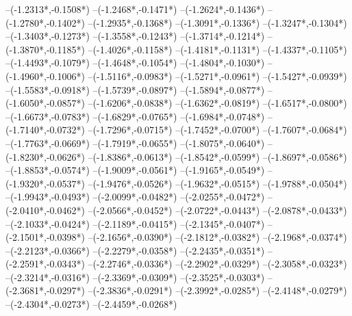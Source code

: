 {	--({-1.2313*\dx},{-0.1508*\dy})
	--({-1.2468*\dx},{-0.1471*\dy})
	--({-1.2624*\dx},{-0.1436*\dy})
	--({-1.2780*\dx},{-0.1402*\dy})
	--({-1.2935*\dx},{-0.1368*\dy})
	--({-1.3091*\dx},{-0.1336*\dy})
	--({-1.3247*\dx},{-0.1304*\dy})
	--({-1.3403*\dx},{-0.1273*\dy})
	--({-1.3558*\dx},{-0.1243*\dy})
	--({-1.3714*\dx},{-0.1214*\dy})
	--({-1.3870*\dx},{-0.1185*\dy})
	--({-1.4026*\dx},{-0.1158*\dy})
	--({-1.4181*\dx},{-0.1131*\dy})
	--({-1.4337*\dx},{-0.1105*\dy})
	--({-1.4493*\dx},{-0.1079*\dy})
	--({-1.4648*\dx},{-0.1054*\dy})
	--({-1.4804*\dx},{-0.1030*\dy})
	--({-1.4960*\dx},{-0.1006*\dy})
	--({-1.5116*\dx},{-0.0983*\dy})
	--({-1.5271*\dx},{-0.0961*\dy})
	--({-1.5427*\dx},{-0.0939*\dy})
	--({-1.5583*\dx},{-0.0918*\dy})
	--({-1.5739*\dx},{-0.0897*\dy})
	--({-1.5894*\dx},{-0.0877*\dy})
	--({-1.6050*\dx},{-0.0857*\dy})
	--({-1.6206*\dx},{-0.0838*\dy})
	--({-1.6362*\dx},{-0.0819*\dy})
	--({-1.6517*\dx},{-0.0800*\dy})
	--({-1.6673*\dx},{-0.0783*\dy})
	--({-1.6829*\dx},{-0.0765*\dy})
	--({-1.6984*\dx},{-0.0748*\dy})
	--({-1.7140*\dx},{-0.0732*\dy})
	--({-1.7296*\dx},{-0.0715*\dy})
	--({-1.7452*\dx},{-0.0700*\dy})
	--({-1.7607*\dx},{-0.0684*\dy})
	--({-1.7763*\dx},{-0.0669*\dy})
	--({-1.7919*\dx},{-0.0655*\dy})
	--({-1.8075*\dx},{-0.0640*\dy})
	--({-1.8230*\dx},{-0.0626*\dy})
	--({-1.8386*\dx},{-0.0613*\dy})
	--({-1.8542*\dx},{-0.0599*\dy})
	--({-1.8697*\dx},{-0.0586*\dy})
	--({-1.8853*\dx},{-0.0574*\dy})
	--({-1.9009*\dx},{-0.0561*\dy})
	--({-1.9165*\dx},{-0.0549*\dy})
	--({-1.9320*\dx},{-0.0537*\dy})
	--({-1.9476*\dx},{-0.0526*\dy})
	--({-1.9632*\dx},{-0.0515*\dy})
	--({-1.9788*\dx},{-0.0504*\dy})
	--({-1.9943*\dx},{-0.0493*\dy})
	--({-2.0099*\dx},{-0.0482*\dy})
	--({-2.0255*\dx},{-0.0472*\dy})
	--({-2.0410*\dx},{-0.0462*\dy})
	--({-2.0566*\dx},{-0.0452*\dy})
	--({-2.0722*\dx},{-0.0443*\dy})
	--({-2.0878*\dx},{-0.0433*\dy})
	--({-2.1033*\dx},{-0.0424*\dy})
	--({-2.1189*\dx},{-0.0415*\dy})
	--({-2.1345*\dx},{-0.0407*\dy})
	--({-2.1501*\dx},{-0.0398*\dy})
	--({-2.1656*\dx},{-0.0390*\dy})
	--({-2.1812*\dx},{-0.0382*\dy})
	--({-2.1968*\dx},{-0.0374*\dy})
	--({-2.2123*\dx},{-0.0366*\dy})
	--({-2.2279*\dx},{-0.0358*\dy})
	--({-2.2435*\dx},{-0.0351*\dy})
	--({-2.2591*\dx},{-0.0343*\dy})
	--({-2.2746*\dx},{-0.0336*\dy})
	--({-2.2902*\dx},{-0.0329*\dy})
	--({-2.3058*\dx},{-0.0323*\dy})
	--({-2.3214*\dx},{-0.0316*\dy})
	--({-2.3369*\dx},{-0.0309*\dy})
	--({-2.3525*\dx},{-0.0303*\dy})
	--({-2.3681*\dx},{-0.0297*\dy})
	--({-2.3836*\dx},{-0.0291*\dy})
	--({-2.3992*\dx},{-0.0285*\dy})
	--({-2.4148*\dx},{-0.0279*\dy})
	--({-2.4304*\dx},{-0.0273*\dy})
	--({-2.4459*\dx},{-0.0268*\dy})
}
